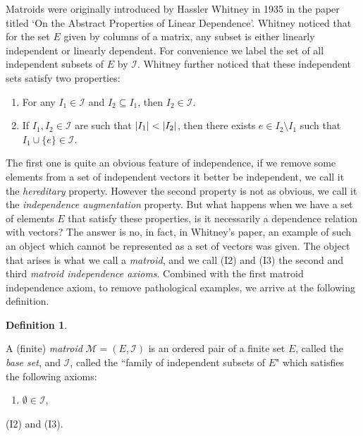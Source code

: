 \documentclass[12pt]{report}
\theoremstyle{definition}
\newtheorem{definition}[theorem]{Definition}
\DeclarePairedDelimiter\abs{\lvert}{\rvert}
\def\calI{\mathcal I}
\def\calM{\mathcal M}
\theoremstyle{upright}
\begin{document}
Matroids were originally introduced by Hassler Whitney in 1935 \cite{whitney1935abstract} in the paper titled `On the Abstract Properties of Linear Dependence'.
Whitney noticed that for the set $E$ given by columns of a matrix, any subset is either linearly independent or linearly dependent.
For convenience we label the set of all independent subsets of $E$ by $\calI$.
Whitney further noticed that these independent sets satisfy two properties:

\begin{enumerate}[label=(I\arabic*), leftmargin=*, align=left]

    \addtocounter{enumi}{1}
    \item For any $I_1\in\calI$ and $I_2\subseteq I_1$, then $I_2\in\calI$.
    \item If $I_1, I_2\in\calI$ are such that $\abs*{I_1}<\abs*{I_2}$, then there exists $e\in I_2\setminus I_1$ such that $I_1\cup\{e\}\in\calI$.
    
\end{enumerate}

The first one is quite an obvious feature of independence, if we remove some elements from a set of independent vectors it better be independent, we call it the \textit{hereditary} property.
However the second property is not as obvious, we call it the \textit{independence augmentation} property.
But what happens when we have a set of elements $E$ that satisfy these properties, is it necessarily a dependence relation with vectors?
The answer is no, in fact, in Whitney's paper, an example of such an object which cannot be represented as a set of vectors was given.
The object that arises is what we call a \textit{matroid}, and we call (I2) and (I3) the second and third \textit{matroid independence axioms}.
Combined with the first matroid independence axiom, to remove pathological examples, we arrive at the following definition.

\begin{definition}\label{def:matroidI}

    A (finite) {\em matroid} $\calM=(E, \calI)$ is an ordered pair of a finite set $E$, called the {\em base set}, and $\calI$, called the ``family of independent subsets of $E$" which satisfies the following axioms:
    
    \begin{enumerate}[label=(I\arabic*), leftmargin=*, align=left]

        \item $\emptyset\in\calI$,
        
    \end{enumerate}

    \noindent (I2) and (I3).
    
\end{definition}
\end{document}
